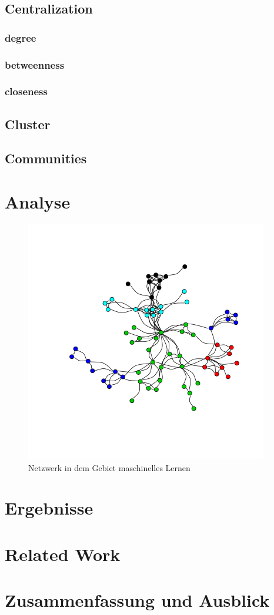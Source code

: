 \documentclass{acm_proc_article-sp}
\begin{document}
\subsection{Centralization}
\subsubsection{degree}
\subsubsection{betweenness}
\subsubsection{closeness}
\subsection{Cluster}
\subsection{Communities}
\section{Analyse}
\begin{figure}
\centering
\includegraphics[scale=0.5]{../visualization/ml_community_graph.png}
\caption{Netzwerk in dem Gebiet maschinelles Lernen}
\end{figure}
\section{Ergebnisse}
\section{Related Work}
\section{Zusammenfassung und Ausblick}
\cite{*}


\end{document}
